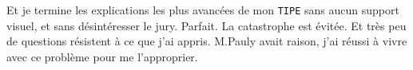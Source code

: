 \documentclass[12pt,final]{report} %
\newcommand{\majuscule}[1]{{\large \texttt{#1}}}
\begin{document}
\begin{cursive}
{Et je termine les explications les plus avancées de mon \majuscule{TIPE} sans aucun support visuel, et sans désintéresser le jury. Parfait. La catastrophe est évitée. Et très peu de questions résistent à ce que j'ai appris. M.Pauly avait raison, j'ai réussi à vivre avec ce problème pour me l'approprier.

\cleardoublepage\newpage\null %

\clearpage
	

  \BgThispage\null\thispagestyle{empty}

  \vfill
  \clearpage  

}\end{cursive}
\end{document}
